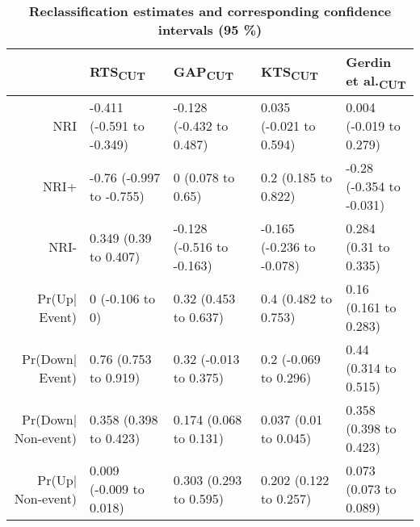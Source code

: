 \begin{table}[!ht]
\centering
\caption{\bf Reclassification estimates and corresponding confidence intervals (95 \%)} 
\label{table:reclassification}
\begin{adjustbox}{max width = \linewidth} 
\begin{tabular} 
{rllll}
  \toprule
 & RTS\textsubscript{CUT} & GAP\textsubscript{CUT} & KTS\textsubscript{CUT} & Gerdin et al.\textsubscript{CUT} \\ 
  \midrule
NRI & -0.411 (-0.591 to -0.349) & -0.128 (-0.432 to 0.487) & 0.035 (-0.021 to 0.594) & 0.004 (-0.019 to 0.279) \\ 
  NRI+ & -0.76 (-0.997 to -0.755) & 0 (0.078 to 0.65) & 0.2 (0.185 to 0.822) & -0.28 (-0.354 to -0.031) \\ 
  NRI- & 0.349 (0.39 to 0.407) & -0.128 (-0.516 to -0.163) & -0.165 (-0.236 to -0.078) & 0.284 (0.31 to 0.335) \\ 
  Pr(Up$|$Event) & 0 (-0.106 to 0) & 0.32 (0.453 to 0.637) & 0.4 (0.482 to 0.753) & 0.16 (0.161 to 0.283) \\ 
  Pr(Down$|$Event) & 0.76 (0.753 to 0.919) & 0.32 (-0.013 to 0.375) & 0.2 (-0.069 to 0.296) & 0.44 (0.314 to 0.515) \\ 
  Pr(Down$|$Non-event) & 0.358 (0.398 to 0.423) & 0.174 (0.068 to 0.131) & 0.037 (0.01 to 0.045) & 0.358 (0.398 to 0.423) \\ 
  Pr(Up$|$Non-event) & 0.009 (-0.009 to 0.018) & 0.303 (0.293 to 0.595) & 0.202 (0.122 to 0.257) & 0.073 (0.073 to 0.089) \\ 
   \bottomrule
\end{tabular} 
\end{adjustbox}
\end{table}

